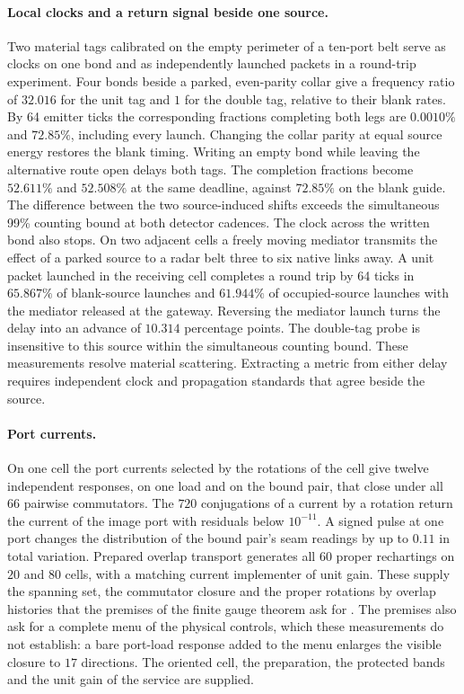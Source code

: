 \documentclass[11pt]{article}
\theoremstyle{definition}
\theoremstyle{remark}
\theoremstyle{plain}
\begin{document}
\paragraph{Local clocks and a return signal beside one source.}
Two material tags calibrated on the empty perimeter of a ten-port
belt serve as clocks on one bond and as independently launched packets
in a round-trip experiment. Four bonds beside a parked, even-parity
collar give a frequency ratio of $32.016$ for the unit tag and $1$
for the double tag, relative to their blank rates. By 64 emitter ticks
the corresponding fractions completing both legs are $0.0010\%$ and
$72.85\%$, including every launch. Changing the collar parity at equal
source energy restores the blank timing. Writing an empty bond while
leaving the alternative route open delays both tags. The completion
fractions become $52.611\%$ and $52.508\%$ at the same deadline,
against $72.85\%$ on the blank guide. The difference between the two
source-induced shifts exceeds the simultaneous 99\% counting bound at
both detector cadences. The clock across the written bond also stops.
On two adjacent cells a freely moving mediator transmits the effect
of a parked source to a radar belt three to six native links away.
A unit packet launched in the receiving cell completes a round trip
by 64 ticks in $65.867\%$ of blank-source launches and $61.944\%$ of
occupied-source launches with the mediator released at the gateway.
Reversing the mediator launch turns the delay into an advance of
$10.314$ percentage points. The double-tag probe is insensitive to
this source within the simultaneous counting bound.
These measurements resolve material scattering. Extracting a metric
from either delay requires independent clock and propagation standards
that agree beside the source.

\paragraph{Port currents.}
On one cell the port currents selected by the rotations of the cell give
twelve independent responses, on one load and on the bound pair, that
close under all $66$ pairwise commutators. The $720$ conjugations of a
current by a rotation return the current of the image port with residuals
below $10^{-11}$. A signed pulse at one port changes the distribution of
the bound pair's seam readings by up to $0.11$ in total variation. Prepared
overlap transport generates all $60$ proper rechartings on $20$ and $80$
cells, with a matching current implementer of unit gain. These supply the
spanning set, the commutator closure and the proper rotations by overlap
histories that the premises of the finite gauge theorem ask for
\cite{ophgauge}. The premises also ask for a complete menu of the physical
controls, which these measurements do not establish: a bare port-load
response added to the menu enlarges the visible closure to $17$
directions. The oriented cell, the preparation, the protected bands and the
unit gain of the service are supplied.
\end{document}
